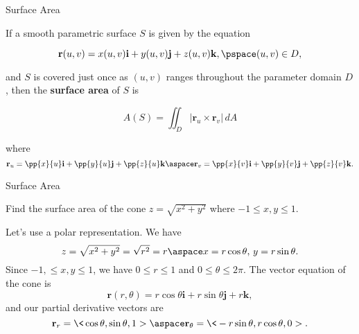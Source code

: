 \documentclass[11pt,english,
handout
]{beamer}
\begin{document}
\begin{frame}[t]{Surface Area}
\small
\begin{definition}
If a smooth parametric surface $S$ is given by the equation

\[
\mathbf{r}(u,v)=x(u,v)\mathbf{i}+y(u,v)\mathbf{j}+z(u,v)\mathbf{k},\pspace (u,v)\in D,
\]

\vspace{3mm}
and $S$ is covered just once as $(u,v)$ ranges throughout the parameter domain $D$, then the \textbf{surface area} of $S$ is

\[
\boxed{A(S)=\iint_D|\mathbf{r}_u\times\mathbf{r}_v|\,dA}
\]

where
\[
\mathbf{r}_u=\pp{x}{u}\mathbf{i}+\pp{y}{u}\mathbf{j}+\pp{z}{u}\mathbf{k}\aspace \mathbf{r}_v=\pp{x}{v}\mathbf{i}+\pp{y}{v}\mathbf{j}+\pp{z}{v}\mathbf{k}.
\]
\end{definition}
\end{frame}












\begin{frame}[t]{Surface Area}
\small
\begin{example}
Find the surface area of the cone $z=\sqrt{x^2+y^2}$ where $-1\leq x,y\leq 1$.\pause

\lspace
Let's use a polar representation. We have 
\[
z=\sqrt{x^2+y^2}=\sqrt{r^2}=r\aspace x=r\cos\theta, \,y=r\sin\theta.
\]\pause
Since $-1,\leq x,y\leq 1$, we have $0\leq r\leq 1$ and $0\leq \theta\leq 2\pi$. \pause The vector equation of the cone is
\[
\mathbf{r}(r,\theta)=r\cos\theta\mathbf{i}+r\sin\theta\mathbf{j}+r\mathbf{k},
\]
and our partial derivative vectors are
\[
\mathbf{r}_r=\<\cos\theta,\sin\theta,1>\aspace\mathbf{r}_\theta=\<-r\sin\theta,r\cos\theta,0>.
\]
\end{example}
\end{frame}
\end{document}
